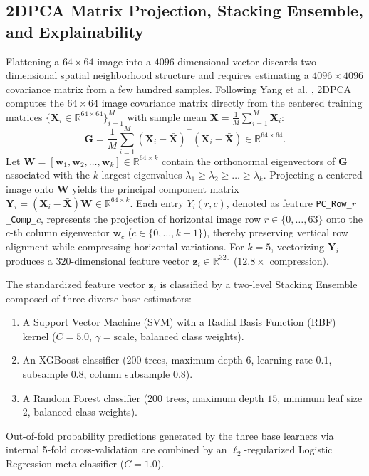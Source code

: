 \subsection{2DPCA Matrix Projection, Stacking Ensemble, and Explainability}

Flattening a $64 \times 64$ image into a $4096$-dimensional vector discards two-dimensional spatial neighborhood structure and requires estimating a $4096 \times 4096$ covariance matrix from a few hundred samples. Following Yang et al. \cite{yang2004two}, 2DPCA computes the $64 \times 64$ image covariance matrix directly from the centered training matrices $\{\mathbf{X}_i \in \mathbb{R}^{64 \times 64}\}_{i=1}^{M}$ with sample mean $\bar{\mathbf{X}} = \frac{1}{M}\sum_{i=1}^{M} \mathbf{X}_i$:
\begin{equation}\label{eq:2dpca_cov}
    \mathbf{G} = \frac{1}{M}\sum_{i=1}^{M} (\mathbf{X}_i - \bar{\mathbf{X}})^\top (\mathbf{X}_i - \bar{\mathbf{X}}) \in \mathbb{R}^{64 \times 64}.
\end{equation}
Let $\mathbf{W} = [\mathbf{w}_1, \mathbf{w}_2, \dots, \mathbf{w}_k] \in \mathbb{R}^{64 \times k}$ contain the orthonormal eigenvectors of $\mathbf{G}$ associated with the $k$ largest eigenvalues $\lambda_1 \ge \lambda_2 \ge \dots \ge \lambda_k$. Projecting a centered image onto $\mathbf{W}$ yields the principal component matrix $\mathbf{Y}_i = (\mathbf{X}_i - \bar{\mathbf{X}})\mathbf{W} \in \mathbb{R}^{64 \times k}$. Each entry $Y_i(r, c)$, denoted as feature \texttt{PC\_Row\_$r$\_Comp\_$c$}, represents the projection of horizontal image row $r \in \{0, \dots, 63\}$ onto the $c$-th column eigenvector $\mathbf{w}_c$ ($c \in \{0, \dots, k-1\}$), thereby preserving vertical row alignment while compressing horizontal variations. For $k=5$, vectorizing $\mathbf{Y}_i$ produces a $320$-dimensional feature vector $\mathbf{z}_i \in \mathbb{R}^{320}$ ($12.8\times$ compression).

The standardized feature vector $\mathbf{z}_i$ is classified by a two-level Stacking Ensemble \cite{wolpert1992stacked} composed of three diverse base estimators:
\begin{enumerate}
    \item A Support Vector Machine (SVM) with a Radial Basis Function (RBF) kernel ($C = 5.0$, $\gamma = \text{scale}$, balanced class weights).
    \item An XGBoost classifier ($200$ trees, maximum depth $6$, learning rate $0.1$, subsample $0.8$, column subsample $0.8$).
    \item A Random Forest classifier ($200$ trees, maximum depth $15$, minimum leaf size $2$, balanced class weights).
\end{enumerate}
Out-of-fold probability predictions generated by the three base learners via internal 5-fold cross-validation are combined by an $\ell_2$-regularized Logistic Regression meta-classifier ($C = 1.0$).

